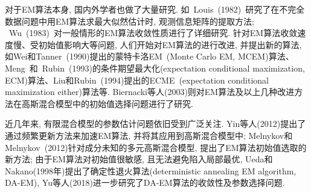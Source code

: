 \documentclass[a4paper,12pt,openany,oneside,utf-8]{ctexbook}
\begin{document}
对于EM算法本身, 国内外学者也做了大量研究. 如~Louis~(1982)~研究了在不完全数据问题中用EM算法求最大似然估计时, 观测信息矩阵的提取方法; ~Wu~(1983)~对一般情形的EM算法收敛性质进行了详细研究. 针对EM算法收敛速度慢、受初始值影响大等问题, 人们开始对EM算法的进行改进, 并提出新的算法, 如Wei和Tanner~(1990)提出的蒙特卡洛EM~(Monte Carlo EM, MCEM)算法、Meng~和~Rubin~(1993)的条件期望最大化(expectation conditional maximization, ECM)算法、Liu和Rubin~(1994)提出的ECME~(expectation conditional maximization either)算法等. Biernacki等人(2003)则对EM算法及以上几种改进方法在高斯混合模型中的初始值选择问题进行了研究.%

近几年来, 有限混合模型的参数估计问题依旧受到广泛关注. 
Yin等人(2012)提出了通过频繁更新方法来加速EM算法, 并将其应用到高斯混合模型中; 
Melnykov和Melnykov~(2012)针对成分未知的多元高斯混合模型, 提出了EM算法初始值选取的新方法;
由于EM算法对初始值很敏感, 且无法避免陷入局部最优, Ueda和Nakano(1998年)提出了确定性退火算法(deterministic annealing EM algorithm, DA-EM), Yu等人(2018)进一步研究了DA-EM算法的收敛性及参数选择问题.
\end{document}
